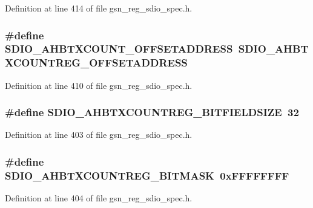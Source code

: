 Definition at line 414 of file gsn\_\-reg\_\-sdio\_\-spec.h.

\hypertarget{a00571_af438c90a95ab102c5dee0c1097293190}{
\subsubsection[{SDIO\_\-AHBTXCOUNT\_\-OFFSETADDRESS}]{\setlength{\rightskip}{0pt plus 5cm}\#define SDIO\_\-AHBTXCOUNT\_\-OFFSETADDRESS~SDIO\_\-AHBTXCOUNTREG\_\-OFFSETADDRESS}}
\label{a00571_af438c90a95ab102c5dee0c1097293190}


Definition at line 410 of file gsn\_\-reg\_\-sdio\_\-spec.h.

\hypertarget{a00571_aa14c1d5f0fcdc76a0c431e74a2edbde7}{
\subsubsection[{SDIO\_\-AHBTXCOUNTREG\_\-BITFIELDSIZE}]{\setlength{\rightskip}{0pt plus 5cm}\#define SDIO\_\-AHBTXCOUNTREG\_\-BITFIELDSIZE~32}}
\label{a00571_aa14c1d5f0fcdc76a0c431e74a2edbde7}


Definition at line 403 of file gsn\_\-reg\_\-sdio\_\-spec.h.

\hypertarget{a00571_a4b3c0600288b50c380ab5f13f0fc541d}{
\subsubsection[{SDIO\_\-AHBTXCOUNTREG\_\-BITMASK}]{\setlength{\rightskip}{0pt plus 5cm}\#define SDIO\_\-AHBTXCOUNTREG\_\-BITMASK~0xFFFFFFFF}}
\label{a00571_a4b3c0600288b50c380ab5f13f0fc541d}


Definition at line 404 of file gsn\_\-reg\_\-sdio\_\-spec.h.

